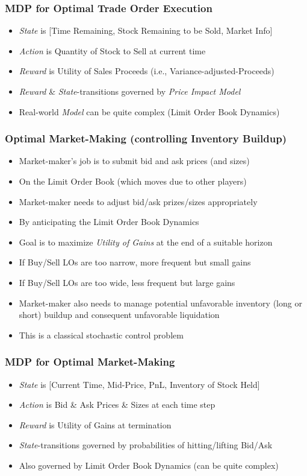 \documentclass[handout]{beamer}
\begin{document}
\begin{frame}
\frametitle{MDP for Optimal Trade Order Execution}
\pause
\begin{itemize}[<+->]
\item {\em State} is [Time Remaining, Stock Remaining to be Sold, Market Info]
\item {\em Action} is Quantity of Stock to Sell at current time
\item {\em Reward} is Utility of Sales Proceeds (i.e., Variance-adjusted-Proceeds)
\item {\em Reward} \& {\em State}-transitions governed by {\em Price Impact Model}
\item Real-world {\em Model} can be quite complex (Limit Order Book Dynamics)
\end{itemize}
\end{frame}

\begin{frame}
\frametitle{Optimal Market-Making (controlling Inventory Buildup)}
\pause
\begin{itemize}[<+->]
\item Market-maker's job is to submit bid and ask prices (and sizes)
\item On the Limit Order Book (which moves due to other players)
\item Market-maker needs to adjust bid/ask prizes/sizes appropriately
\item By anticipating the Limit Order Book Dynamics
\item Goal is to maximize {\em Utility of Gains} at the end of a suitable horizon
\item If Buy/Sell LOs are too narrow, more frequent but small gains
\item If Buy/Sell LOs are too wide, less frequent but large gains
\item Market-maker also needs to manage potential unfavorable inventory (long or short) buildup and consequent unfavorable liquidation
\item This is a classical stochastic control problem
\end{itemize}
\end{frame}

\begin{frame}
\frametitle{MDP for Optimal Market-Making}
\pause
\begin{itemize}[<+->]
\item {\em State} is [Current Time, Mid-Price, PnL, Inventory of Stock Held]
\item {\em Action} is Bid \& Ask Prices \& Sizes at each time step
\item {\em Reward} is Utility of Gains at termination
\item {\em State}-transitions governed by probabilities of hitting/lifting Bid/Ask
\item Also governed by Limit Order Book Dynamics (can be quite complex)
\end{itemize}
\end{frame}
\end{document}
